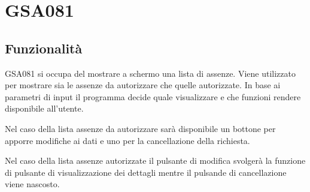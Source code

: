 \documentclass[target=bach,aauheader=,style=]{thud}
\begin{document}
\section{GSA081}
\subsection{Funzionalità}
GSA081 si occupa del mostrare a schermo una lista di assenze. Viene utilizzato per mostrare sia le assenze da autorizzare che quelle autorizzate.
In base ai parametri di input il programma decide quale visualizzare e che funzioni rendere disponibile all'utente.

Nel caso della lista assenze da autorizzare sarà disponibile un bottone per apporre modifiche ai dati e uno per la cancellazione della richiesta.

Nel caso della lista assenze autorizzate il pulsante di modifica svolgerà la funzione di pulsante di visualizzazione dei dettagli mentre il pulsande di cancellazione viene nascosto.
\end{document}
